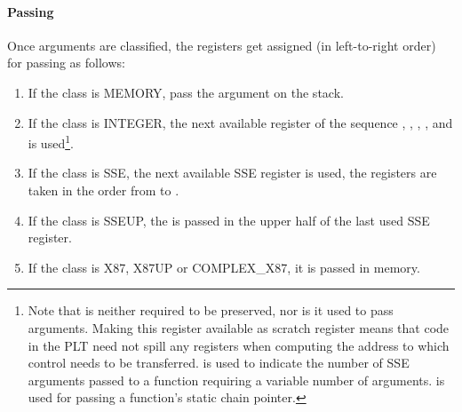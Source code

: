 \paragraph{Passing}
Once arguments are classified, the registers get assigned (in
left-to-right order) for passing as follows:

\begin{enumerate}
\item If the class is MEMORY, pass the argument on the stack.

\item If the class is INTEGER, the next available register of the
  sequence \RDI, \RSI, \RDX, \RCX,  and  is
  used\footnote{Note that  is neither required to be
    preserved, nor is it used to pass arguments.  Making this register
    available as scratch register means that code in the PLT need not
    spill any registers when computing the address to which control
    needs to be transferred.  \RAX is used to indicate the number of
    SSE arguments passed to a function requiring a variable number of
    arguments.  is used for passing a function's static chain
    pointer.}.

\item If the class is SSE, the next available SSE register is used, the
   registers are taken in the order from  to .

\item If the class is SSEUP, the \eightbyte is passed in the upper
   half of the last used SSE register.

\item If the class is X87, X87UP or COMPLEX\_X87, it is passed in memory.
\end{enumerate}

